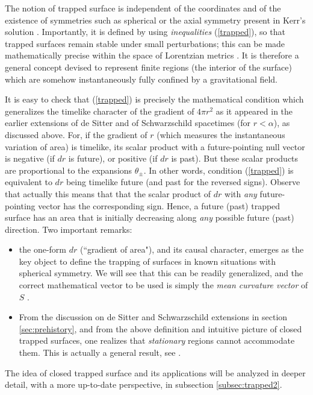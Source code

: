 \documentclass[12pt]{iopart}
\begin{document}
The notion of trapped surface is independent of the coordinates and of the existence of symmetries such as spherical or the axial symmetry present in Kerr's solution \cite{Kerr,Exact,HE}. Importantly, it is defined by using {\em inequalities} (\ref{trapped}), so that trapped surfaces remain stable under small perturbations; this can be made mathematically precise within the space of Lorentzian metrics \cite{Ler}. It is therefore a general concept devised to represent finite regions (the interior of the surface) which are somehow instantaneously fully confined by a gravitational field.

It is easy to check that (\ref{trapped}) is precisely the mathematical condition which generalizes the timelike character of the gradient of $4\pi r^2$ as it appeared in the earlier extensions of de Sitter and of Schwarzschild spacetimes (for $r<\alpha$), as discussed above. For, if the gradient of $r$ (which measures the instantaneous variation of area) is timelike, its scalar product with a future-pointing null vector is negative (if $dr$ is future), or positive (if $dr$ is past). But these scalar products are proportional to the expansions $\theta_\pm$. In other words, condition (\ref{trapped}) is equivalent to $dr$ being timelike future (and past for the reversed signs). Observe that actually this means that that the scalar product of $dr$ with {\em any} future-pointing vector has the corresponding sign. Hence, a future (past) trapped surface has an area that is initially decreasing along {\em any} possible future (past) direction. Two important remarks:
\begin{itemize}
\item the one-form $dr$ (``gradient of area"), and its causal character, emerges as the key object to define the trapping of surfaces in known situations with spherical symmetry. We will see that this can be readily generalized, and the correct mathematical vector to be used is simply the {\em mean curvature vector} of $S$ \cite{Kri,MS,O}.
\item From the discussion on de Sitter and Schwarzschild extensions in section \ref{sec:prehistory}, and from the above definition and intuitive picture of closed trapped surfaces, one realizes that {\em stationary} regions cannot accommodate them. This is actually a general result, see \cite{MS}.
\end{itemize}
The idea of closed trapped surface and its applications will be analyzed in deeper detail, with a more up-to-date perspective, in subsection \ref{subsec:trapped2}.
\end{document}
